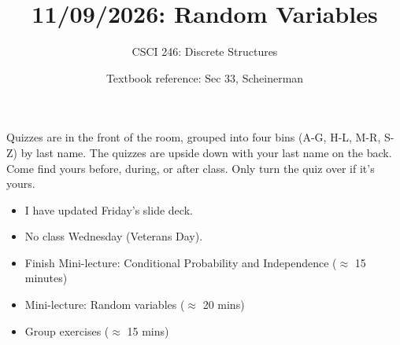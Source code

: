 \documentclass[10pt]{beamer}
\begin{document}
\title{11/09/2026: Random Variables}
\author{CSCI 246: Discrete Structures}
\date{Textbook reference: Sec 33, Scheinerman}

\begin{frame}
    \titlepage 
\end{frame}


\begin{frame}
\small
\begin{mygreenbox}[title=Graded Quiz Pickup]
Quizzes are in the front of the room, grouped into four bins (A-G, H-L, M-R, S-Z) by last name. The quizzes are upside down with your last name on the back. Come find yours before, during, or after class. Only turn the quiz over if it's yours. %
\end{mygreenbox} 
\vfill 
\begin{myredbox}[title=\text{Announcements}]

\begin{itemize}
\item I have updated Friday's slide deck.
\item No class Wednesday (Veterans Day).
\end{itemize}
\end{myredbox}

\vfill 
\begin{myyellowbox}[title=Today's Agenda]
\begin{itemize}	
	\item Finish Mini-lecture: Conditional Probability and Independence ($\approx$ 15 minutes)
	\item Mini-lecture: Random variables ($\approx$ 20 mins)
	\item Group exercises ($\approx$ 15 mins)
\end{itemize}


\end{myyellowbox}
\vfill 

\end{frame}
\end{document}
